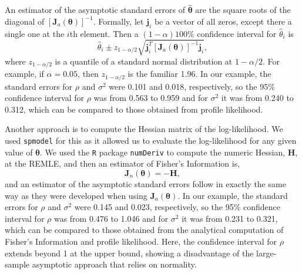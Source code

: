 \documentclass[12pt, titlepage]{article}
\begin{document}
An estimator of the asymptotic standard errors of $\hat{\boldsymbol{\theta}}$ are the square roots of the diagonal of $[\boldsymbol{J}_{a}{(\boldsymbol{\theta})}]^{-1}$.  Formally, let $\mathbf{j}_{i}$ be a vector of all zeros, except there a single one at the $i$th element.  Then a $(1 - \alpha)100$\% confidence interval for $\hat{\theta}_{i}$ is
$$
\hat{\theta}_{i} \pm z_{1-\alpha/2}\sqrt{\mathbf{j}_{i}^{T}[\boldsymbol{J}_{a}{(\boldsymbol{\theta})}]^{-1}\mathbf{j}_{i}},
$$
where $z_{1-\alpha/2}$ is a quantile of a standard normal distribution at $1-\alpha/2$.  For example, if $\alpha = 0.05$, then $z_{1-\alpha/2}$ is the familiar 1.96.  In our example, the standard errors for $\rho$ and $\sigma^{2}$ were 0.101 and 0.018, respectively, so the 95\% confidence interval for $\rho$ was from 0.563 to 0.959 and for $\sigma^{2}$ it was from 0.240 to 0.312, which can be compared to those obtained from profile likelihood.

Another approach is to compute the Hessian matrix of the log-likelihood.  We used \texttt{spmodel} for this as it allowed us to evaluate the log-likelihood for any given value of $\boldsymbol{\theta}$.  We used the \texttt{R} package \texttt{numDeriv} to compute the numeric Hessian, $\mathbf{H}$, at the REMLE, and then an estimator of Fisher's Information is,
$$
\boldsymbol{J}_{n}{(\boldsymbol{\theta})} = -\mathbf{H},
$$
and an estimator of the asymptotic standard errors follow in exactly the same way as they were developed when using $\boldsymbol{J}_{a}{(\boldsymbol{\theta})}$.  In our example, the standard errors for $\rho$ and $\sigma^{2}$ were 0.145 and 0.023, respectively, so the 95\% confidence interval for $\rho$ was from 0.476 to 1.046 and for $\sigma^{2}$ it was from 0.231 to 0.321, which can be compared to those obtained from the analytical computation of Fisher's Information and profile likelihood.  Here, the confidence interval for $\rho$ extends beyond 1 at the upper bound, showing a disadvantage of the large-sample asymptotic approach that relies on normality.
\end{document}
